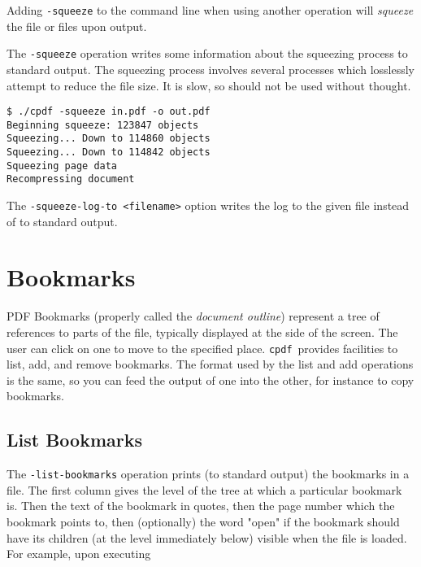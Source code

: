 \documentclass{book}
\newcommand{\cpdf}{\texttt{cpdf}}
\begin{document}
\noindent{}
  \noindent Adding \texttt{-squeeze} to the command line when using another operation will \textit{squeeze} the file or files upon output.
  
  The \texttt{-squeeze} operation writes some information about the squeezing process to standard output. The squeezing process involves several processes which losslessly attempt to reduce the file size. It is slow, so should not be used without thought.

\begin{verbatim}
$ ./cpdf -squeeze in.pdf -o out.pdf
Beginning squeeze: 123847 objects
Squeezing... Down to 114860 objects
Squeezing... Down to 114842 objects
Squeezing page data
Recompressing document\end{verbatim}

The \texttt{-squeeze-log-to <filename>} option writes the log to the given file instead of to standard output.



\chapter{Bookmarks}
\noindent{}
  PDF Bookmarks (properly called the \textit{document outline}) represent a tree
of references to parts of the file, typically displayed at the side of the
screen. The user can click on one to move to the specified place. \cpdf\ provides
facilities to list, add, and remove bookmarks. The format used by the list and
add operations is the same, so you can feed the output of one into the other,
for instance to copy bookmarks.

  \section{List Bookmarks}
  The \texttt{-list-bookmarks} operation prints (to standard output) the
bookmarks in a file. The first column gives the level of the tree at which a
particular bookmark is. Then the text of the bookmark in quotes, then the page
number which the bookmark points to, then (optionally) the word "open" if the
bookmark should have its children (at the level immediately below) visible when
the file is loaded. For example, upon executing
\end{document}
